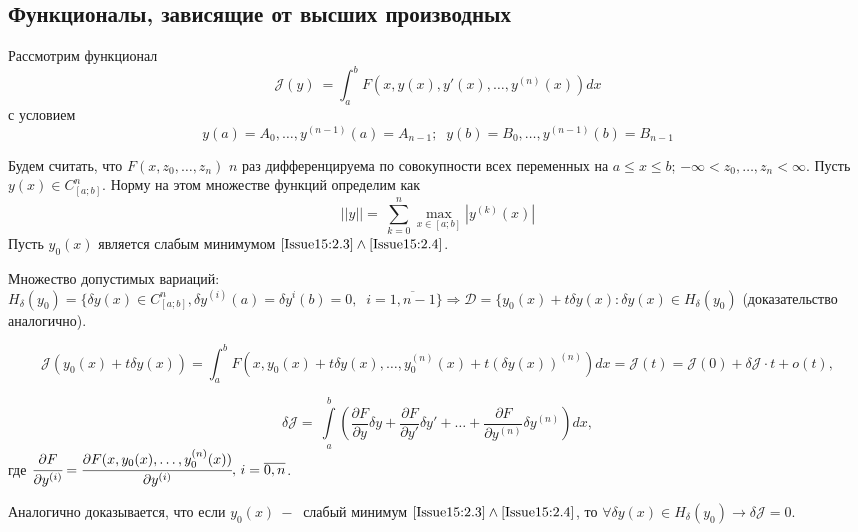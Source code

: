 
\subsection{Функционалы, зависящие от высших производных}
Рассмотрим функционал 
\begin{equation} 
	\label{Issue15:2.3}
	\mathcal{J}(y) ~ = \int_a^bF(x,y(x),y'(x),\dots , y^{(n)}(x))d x
\end{equation}
с условием 
\begin{equation}
	\label{Issue15:2.4}
	y(a)=A_0,\dots ,y^{(n-1)}(a)=A_{n-1};\;\;y(b)=B_0,\dots , y^{(n-1)}(b)=B_{n-1}
\end{equation}

Будем считать, что $F(x,z_0,\dots , z_n)$ $n$ раз дифференцируема по совокупности всех переменных на $a\leqslant x\leqslant b$; $-\infty < z_0, \dots , z_n< \infty $. Пусть $y(x)\in C^n_{[a;b]}$. Норму на этом множестве функций определим как $$||y||= ~ \sum_{k=0}^{n}\underset{x \in [a;b]}{\max}|y^{(k)}(x)|$$
Пусть $y_0(x)$ является слабым минимумом $\eqref{Issue15:2.3}\wedge \eqref{Issue15:2.4}$.

Множество допустимых вариаций: $H_\delta(y_0)=\{ \delta y(x) \in C_{[a;b]}^n, \delta y^{(i)}(a)=\delta y^{i}(b)=0,\;\;i=\overline{1,n-1}\}\Rightarrow \mathcal{D}=\{y_0(x)+t\delta y(x):\delta y(x)\in H_\delta (y_0)$ (доказательство аналогично).

\[
    \mathcal{J}(y_0(x)+t\delta y(x)) = \int^b_a F(x, y_0(x)+t\delta y(x),\dots ,y_0^{(n)}(x)+t(\delta y(x))^{(n)} )dx =\mathcal{J}(t)=\mathcal{J}(0)+\delta\mathcal{J} \cdot t+o(t), 
\]

\[
    \delta \mathcal{J}= ~ \int\limits_a^b\left(\frac{\partial F}{\partial y}\delta y + \frac{\partial F}{\partial y'}\delta y' +\dots +  \frac{\partial F}{\partial y^{(n)}}\delta y^{(n)} \right) dx,
\]
 где $\cfrac{\partial F}{\partial y^{(i)}}= \cfrac{\partial F(x,y_0(x),\dots,y_0^{(n)}(x))}{\partial y^{(i)}}, \, i = \overline{0, n}$.

Аналогично доказывается, что если $y_0(x)~-~$ слабый минимум $\eqref{Issue15:2.3}\wedge\eqref{Issue15:2.4}$, то $\forall\delta y(x)\in H_\delta (y_0)\rightarrow \delta\mathcal{J}=0$.

